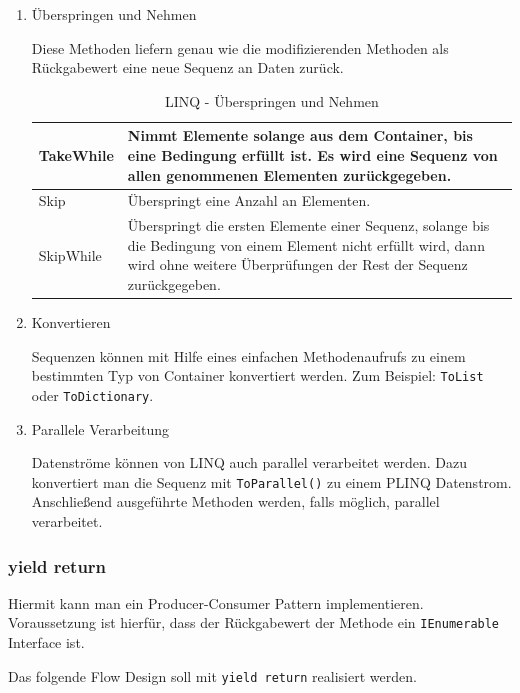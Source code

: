 \begin{enumerate}
\item Überspringen und Nehmen

Diese Methoden liefern genau wie die modifizierenden Methoden als Rückgabewert
eine neue Sequenz an Daten zurück.

\bigskip
\begin{table}[H]
	\centering
\begin{tabularx}{\textwidth}{|p{130pt}|X|}
	\hline
TakeWhile & Nimmt Elemente solange aus dem Container, bis eine Bedingung erfüllt ist. Es wird eine Sequenz von allen genommenen Elementen zurückgegeben.\\	\hline
Skip & Überspringt eine Anzahl an Elementen.\\	\hline
SkipWhile & Überspringt die ersten Elemente einer Sequenz, solange bis die Bedingung von einem Element nicht erfüllt wird, dann wird ohne weitere Überprüfungen der Rest der Sequenz zurückgegeben.\\	\hline
\end{tabularx}
	\medskip
	\caption{LINQ - Überspringen und Nehmen}
	
\end{table}

\item Konvertieren

Sequenzen können mit Hilfe eines einfachen Methodenaufrufs zu einem bestimmten Typ
von Container konvertiert werden. Zum Beispiel: \texttt{ToList} oder \texttt{ToDictionary}.

\item Parallele Verarbeitung

Datenströme können von LINQ auch parallel verarbeitet werden. Dazu konvertiert
man die Sequenz mit \texttt{ToParallel()} zu einem PLINQ Datenstrom.
Anschließend ausgeführte Methoden werden, falls möglich, parallel verarbeitet.

\end{enumerate}

\subsubsection{yield return}

Hiermit kann man ein Producer-Consumer Pattern implementieren.
Voraussetzung ist hierfür, dass der Rückgabewert der Methode ein \texttt{IEnumerable} Interface ist.

Das folgende Flow Design soll mit \texttt{yield return} realisiert werden.

